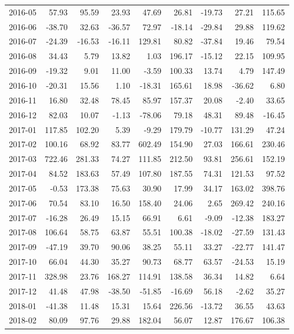 \begin{table}[ht]
\begin{tabular}{lrrrrrrrr}
  2016-05 & 57.93 & 95.59 & 23.93 & 47.69 & 26.81 & -19.73 & 27.21 & 115.65 \\ 
  2016-06 & -38.70 & 32.63 & -36.57 & 72.97 & -18.14 & -29.84 & 29.88 & 119.62 \\ 
  2016-07 & -24.39 & -16.53 & -16.11 & 129.81 & 80.82 & -37.84 & 19.46 & 79.54 \\ 
  2016-08 & 34.43 & 5.79 & 13.82 & 1.03 & 196.17 & -15.12 & 22.15 & 109.95 \\ 
  2016-09 & -19.32 & 9.01 & 11.00 & -3.59 & 100.33 & 13.74 & 4.79 & 147.49 \\ 
  2016-10 & -20.31 & 15.56 & 1.10 & -18.31 & 165.61 & 18.98 & -36.62 & 6.80 \\ 
  2016-11 & 16.80 & 32.48 & 78.45 & 85.97 & 157.37 & 20.08 & -2.40 & 33.65 \\ 
  2016-12 & 82.03 & 10.07 & -1.13 & -78.06 & 79.18 & 48.31 & 89.48 & -16.45 \\ 
  2017-01 & 117.85 & 102.20 & 5.39 & -9.29 & 179.79 & -10.77 & 131.29 & 47.24 \\ 
  2017-02 & 100.16 & 68.92 & 83.77 & 602.49 & 154.90 & 27.03 & 166.61 & 230.46 \\ 
  2017-03 & 722.46 & 281.33 & 74.27 & 111.85 & 212.50 & 93.81 & 256.61 & 152.19 \\ 
  2017-04 & 84.52 & 183.63 & 57.49 & 107.80 & 187.55 & 74.31 & 121.53 & 97.52 \\ 
  2017-05 & -0.53 & 173.38 & 75.63 & 30.90 & 17.99 & 34.17 & 163.02 & 398.76 \\ 
  2017-06 & 70.54 & 83.10 & 16.50 & 158.40 & 24.06 & 2.65 & 269.42 & 240.16 \\ 
  2017-07 & -16.28 & 26.49 & 15.15 & 66.91 & 6.61 & -9.09 & -12.38 & 183.27 \\ 
  2017-08 & 106.64 & 58.75 & 63.87 & 55.51 & 100.38 & -18.02 & -27.59 & 131.43 \\ 
  2017-09 & -47.19 & 39.70 & 90.06 & 38.25 & 55.11 & 33.27 & -22.77 & 141.47 \\ 
  2017-10 & 66.04 & 44.30 & 35.27 & 90.73 & 68.77 & 63.57 & -24.53 & 15.19 \\ 
  2017-11 & 328.98 & 23.76 & 168.27 & 114.91 & 138.58 & 36.34 & 14.82 & 6.64 \\ 
  2017-12 & 41.48 & 47.98 & -38.50 & -51.85 & -16.69 & 56.18 & -2.62 & 35.27 \\ 
  2018-01 & -41.38 & 11.48 & 15.31 & 15.64 & 226.56 & -13.72 & 36.55 & 43.63 \\ 
  2018-02 & 80.09 & 97.76 & 29.88 & 182.04 & 56.07 & 12.87 & 176.67 & 106.38 \\ 

\end{tabular}
\end{table}
